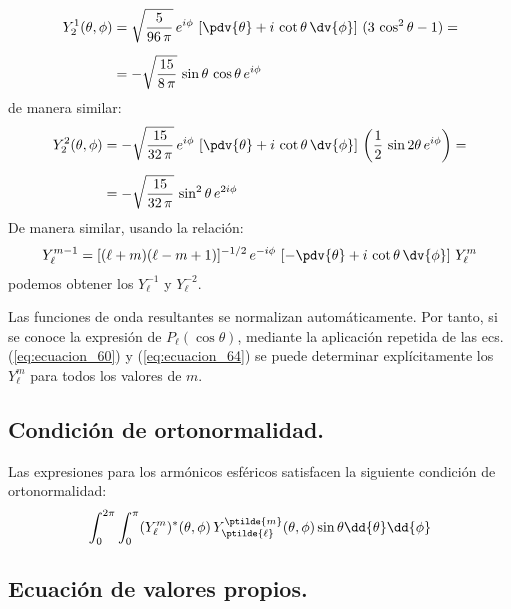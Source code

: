 \begin{align}
\begin{aligned}[b]
Y_{2}^{1} (\theta, \phi) &= \sqrt{\dfrac{5}{96 \, \pi}} \, e^{i \phi} \, \left[ \pdv{\theta} + i \, \cot \theta \, \dv{\phi} \right] \, (3 \, \cos^{2} \theta - 1) = \\[0.5em]
&= - \sqrt{\dfrac{15}{8 \, \pi}} \, \sin \theta \, \cos \theta \, e^{i \phi}
\end{aligned}
\label{eq:ecuacion_62}
\end{align}
de manera similar:
\begin{align}
\begin{aligned}[b]
Y_{2}^{2} (\theta, \phi) &= - \sqrt{\dfrac{15}{32 \, \pi}} \, e^{i \phi} \, \left[ \pdv{\theta} + i \, \cot \theta \, \dv{\phi} \right] \, \left( \dfrac{1}{2} \, \sin 2 \theta \, e^{i \phi} \right) = \\[0.5em]
&= - \sqrt{\dfrac{15}{32 \, \pi}} \, \sin^{2} \theta \,  e^{2 i \phi}
\end{aligned}
\label{eq:ecuacion_63}
\end{align}
De manera similar, usando la relación:
\begin{align}
Y_{\ell}^{m-1} = [(\ell + m)(\ell - m + 1)]^{-1/2} \, e^{-i \phi} \, \left[ - \pdv{\theta} + i \, \cot \theta \, \dv{\phi} \right] \, Y_{\ell}^{m}
\label{eq:ecuacion_64}
\end{align}
podemos obtener los $Y_{\ell}^{-1}$ y $Y_{\ell}^{-2}$.
\par
Las funciones de onda resultantes se normalizan automáticamente. Por tanto, si se conoce la expresión de $P_{\ell} (\cos \theta)$, mediante la aplicación repetida de las ecs. (\ref{eq:ecuacion_60}) y (\ref{eq:ecuacion_64}) se puede determinar explícitamente los $Y_{\ell}^{m}$ para todos los valores de $m$.
\subsection{Condición de ortonormalidad.}

Las expresiones para los armónicos esféricos satisfacen la siguiente condición de ortonormalidad:
\begin{align}
\int_{0}^{2 \pi} \int_{0}^{\pi} (Y_{\ell}^{m})^{*} (\theta, \phi) \, Y_{\ptilde{\ell}}^{\ptilde{m}} (\theta, \phi) \sin \theta \dd{\theta} \dd{\phi}
\label{eq:ecuacion_65}
\end{align}
\subsection{Ecuación de valores propios.}

